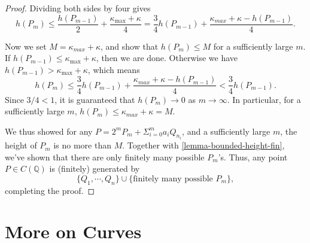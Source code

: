 \documentclass[12pt]{article}
\theoremstyle{remark}
\theoremstyle{definition}
\begin{document}
\begin{proof}
        Dividing both sides by four gives
        $$h(P_m)\leqslant \frac{h(P_{m-1})}{2}+\frac{\kappa_{\max}+\kappa}{4}=\frac{3}{4}h(P_{m-1})+\frac{\kappa_{max}+\kappa-h(P_{m-1})}{4}.$$
    
        Now we set $M=\kappa_{max}+\kappa$, and show that $h(P_m)\leq M$ for a sufficiently large $m$. If $h(P_{m-1})\leqslant \kappa_{\max}+\kappa$, then we are done. Otherwise we have $h(P_{m-1})> \kappa_{\max}+\kappa$, which means 
        $$h(P_m)\leqslant\frac{3}{4}h(P_{m-1})+\frac{\kappa_{max}+\kappa-h(P_{m-1})}{4}<\frac{3}{4}h(P_{m-1}).$$
        Since $3/4<1$, it is guaranteed that $h(P_m)\rightarrow 0$ as $m\to\infty$. In particular, for a sufficiently large $m$, $h(P_m)\leq \kappa_{max}+\kappa=M$.
    
        We thus showed for any $P = 2^mP_m+\Sigma_{i=0}^ma_iQ_{n_i}$, and a sufficiently large $m$, the height of $P_m$ is no more than $M$. Together with \autoref{lemma-bounded-height-fin}, we've shown that there are only finitely many possible $P_m$'s. Thus, any point $P\in C(\mathbb{Q})$ is (finitely) generated by
        $$\{Q_1,\cdots,Q_n\}\cup\{\text{finitely many possible }P_m\},$$
        completing the proof.
    \end{proof}
    
    
    
    \newpage
    \section{More on Curves}
\end{document}
